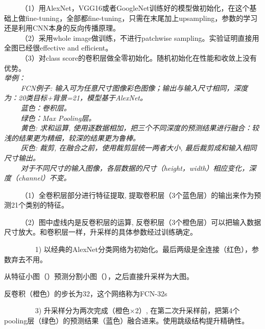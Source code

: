   
（1）用AlexNet，VGG16或者GoogleNet训练好的模型做初始化，在这个基础上做fine-tuning，全部都fine-tuning，只需在末尾加上upsampling，参数的学习还是利用CNN本身的反向传播原理。\\
   （2）采用whole image做训练，不进行patchwise
sampling。实验证明直接用全图已经很effective and efficient。\\
   （3）对class
score的卷积层做全零初始化。随机初始化在性能和收敛上没有优势。\\
\emph{举例：}\\
   \emph{FCN例子:
输入可为任意尺寸图像彩色图像；输出与输入尺寸相同，深度为：20类目标+背景=21，模型基于AlexNet。}\\
   \emph{蓝色：卷积层。}\\
   \emph{绿色：Max Pooling层。}\\
   \emph{黄色: 求和运算,
使用逐数据相加，把三个不同深度的预测结果进行融合：较浅的结果更为精细，较深的结果更为鲁棒。}\\
   \emph{灰色: 裁剪, 在融合之前，使用裁剪层统一两者大小,
最后裁剪成和输入相同尺寸输出。}\\
  
\emph{对于不同尺寸的输入图像，各层数据的尺寸（height，width）相应变化，深度（channel）不变。}

   （1）全卷积层部分进行特征提取,
提取卷积层（3个蓝色层）的输出来作为预测21个类别的特征。

   （2）图中虚线内是反卷积层的运算,
反卷积层（3个橙色层）可以把输入数据尺寸放大。和卷积层一样，升采样的具体参数经过训练确定。

     1)
以经典的AlexNet分类网络为初始化。最后两级是全连接（红色），参数弃去不用。

从特征小图（）预测分割小图（），之后直接升采样为大图。

\begin{figure}
\centering
\end{figure}

反卷积（橙色）的步长为32，这个网络称为FCN-32s

     3) 升采样分为两次完成（橙色×2）,
在第二次升采样前，把第4个pooling层（绿色）的预测结果（蓝色）融合进来。使用跳级结构提升精确性。

\begin{figure}
\centering
\end{figure}

